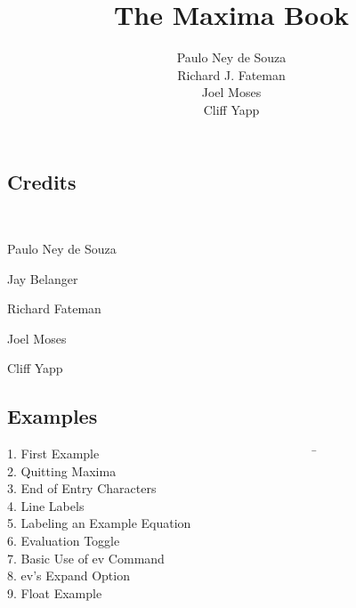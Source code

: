 \documentclass[oneside,english]{book}
\begin{document}
\title{The Maxima Book}

\author{Paulo Ney de Souza\\
        Richard J. Fateman \\
                Joel Moses \\
                Cliff Yapp}
                

\maketitle

\subsection*{Credits}

~

Paulo Ney de Souza

Jay Belanger

Richard Fateman

Joel Moses

Cliff Yapp\\
\newpage


\tableofcontents
\newpage

 

\subsection*{Examples}
\begin{multicols}{2}
\begin{tabbing}
1. First Example~~~~~~~~~~~~~~~~~~~~~~~~~~~~~~~~~~~\= \pageref{Example1} \\
2. Quitting Maxima \>\pageref{Quitting Maxima (Example 2)}\\
3. End of Entry Characters \>\pageref{End of Entry Characters (Example 3)}\\
4. Line Labels \>\pageref{Line Labels (Example 4)}\\
5. Labeling an Example Equation \>\pageref{Labeling an Equation (Example 5)}\\
6. Evaluation Toggle \>\pageref{Evaluation Toggle (Example 6)} \\
7. Basic Use of ev Command \>\pageref{Basic Use of ev Command (Example 7)}\\
8. ev's Expand Option \>\pageref{ev's Expand Option (Example 8)}\\
9. Float Example \>\pageref{FLOAT example (Example 9)}\\
\end{tabbing}
\end{multicols}
\end{document}
